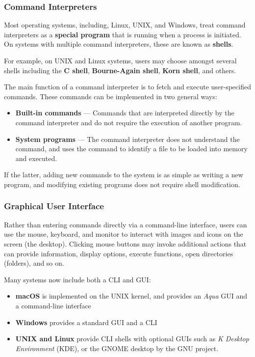 \documentclass{article}
\begin{document}
\subsubsection{Command Interpreters}
Most operating systems, including, Linux, UNIX, and Windows, treat
command interpreters as a \textbf{special program} that is running when
a process is initiated. On systems with multiple command interpreters,
these are known as \textbf{shells}.

For example, on UNIX and Linux systems, users may choose amongst several
shells including the \textbf{C shell}, \textbf{Bourne-Again shell},
\textbf{Korn shell}, and others.

The main function of a command interpreter is to fetch and execute
user-specified commands. These commands can be implemented in two
general ways:
\begin{itemize}
    \item \textbf{Built-in commands} --- Commands that are interpreted
          directly by the command interpreter and do not require the
          execution of another program.
    \item \textbf{System programs} --- The command interpreter does not
          understand the command, and uses the command to identify a file
          to be loaded into memory and executed.
\end{itemize}
If the latter, adding new commands to the system is as simple as
writing a new program, and modifying existing programs does not
require shell modification.
\subsubsection{Graphical User Interface}
Rather than entering commands directly via a command-line interface,
users can use the mouse, keyboard, and monitor to interact with images
and icons on the screen (the desktop). Clicking mouse buttons may
invoke additional actions that can provide information, display
options, execute functions, open directories (folders), and so on.

Many systems now include both a CLI and GUI:\@
\begin{itemize}
    \item \textbf{macOS} is implemented on the UNIX kernel, and provides
          an \textit{Aqua} GUI and a command-line interface
    \item \textbf{Windows} provides a standard GUI and a CLI
    \item \textbf{UNIX and Linux} provide CLI shells with optional GUIs
          such as \textit{K Desktop Environment} (KDE), or the GNOME
          desktop by the GNU project.
\end{itemize}
\end{document}
